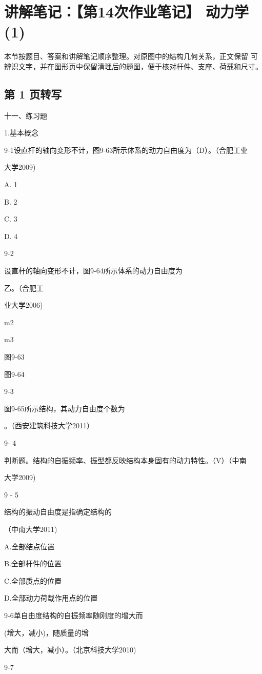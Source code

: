 \section{讲解笔记：【第14次作业笔记】 动力学(1)}
\begin{analysisbox}
本节按题目、答案和讲解笔记顺序整理。对原图中的结构几何关系，正文保留 可辨识文字，并在图形页中保留清理后的题图，便于核对杆件、支座、荷载和尺寸。
\end{analysisbox}
\subsection*{第 1 页转写}
十一、练习题

1.基本概念

9-1设直杆的轴向变形不计，图9-63所示体系的动力自由度为（D）。（合肥工业

大学2009)

A. 1

B. 2

C. 3

D. 4

9-2

设直杆的轴向变形不计，图9-64所示体系的动力自由度为

乙。（合肥工

业大学2006)

m2

m3

图9-63

图9-64

9-3

图9-65所示结构，其动力自由度个数为

。（西安建筑科技大学2011）

9- 4

判断题。结构的自振频率、振型都反映结构本身固有的动力特性。（V）（中南

大学2009)

9 - 5

结构的振动自由度是指确定结构的

（中南大学2011)

A.全部结点位置

B.全部杆件的位置

C.全部质点的位置

D.全部动力荷载作用点的位置

9-6单自由度结构的自振频率随刚度的增大而

(增大，减小)，随质量的增

大而（增大，减小）。（北京科技大学2010)

9-7

